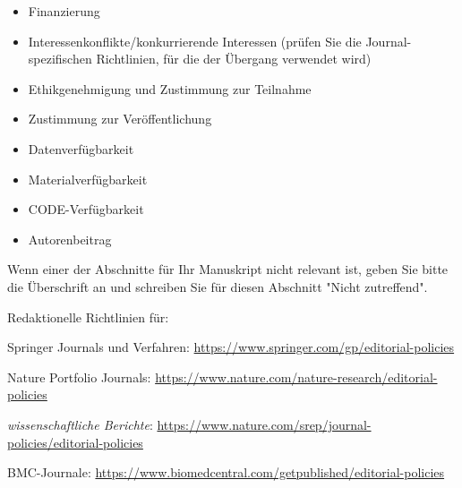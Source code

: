 \documentclass[pdflatex,sn-mathphys-num]{sn-jnl}%
\theoremstyle{thmstyleone}%
\theoremstyle{thmstyletwo}%
\theoremstyle{thmstylethree}%
\begin{document}
\begin{itemize}
\item Finanzierung
\item Interessenkonflikte/konkurrierende Interessen (prüfen Sie die Journal-spezifischen Richtlinien, für die der Übergang verwendet wird)
\item Ethikgenehmigung und Zustimmung zur Teilnahme
\item Zustimmung zur Veröffentlichung
\item Datenverfügbarkeit
\item Materialverfügbarkeit
\item CODE-Verfügbarkeit
\item Autorenbeitrag
\end{itemize}

\noindent
Wenn einer der Abschnitte für Ihr Manuskript nicht relevant ist, geben Sie bitte die Überschrift an und schreiben Sie für diesen Abschnitt "Nicht zutreffend".

\bigskip
\begin{flushleft} %
Redaktionelle Richtlinien für:

\bigskip \noindent
Springer Journals und Verfahren: \url{https://www.springer.com/gp/editorial-policies}

\bigskip \noindent
Nature Portfolio Journals: \url{https://www.nature.com/nature-research/editorial-policies}

\bigskip \noindent
\textit{wissenschaftliche Berichte}: \url{https://www.nature.com/srep/journal-policies/editorial-policies}

\bigskip \noindent
BMC-Journale: \url{https://www.biomedcentral.com/getpublished/editorial-policies}
\end{flushleft}
\end{document}
